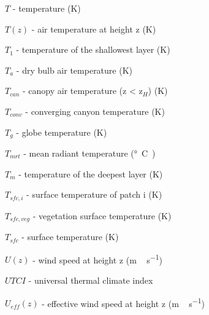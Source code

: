 {\begin{description}
\item $T$  -  temperature (\unit{K}) 
\item $T(z)$  -   air temperature at height z (\unit{K}) 
\item $T_{1}$  -  temperature of the shallowest layer (\unit{K}) 
\item $T_{a}$  -  dry bulb air temperature (\unit{K}) 
\item $T_{can}$  -    canopy air temperature (z < z$_{H}$) (\unit{K}) 
\item $T_{conv}$  -   converging canyon temperature (\unit{K}) 
\item $T_{g}$  -  globe temperature (\unit{K}) 
\item $T_{mrt}$  -  mean radiant temperature (\unit{\degree C)}  
\item $T_{m}$  -    temperature of the deepest layer (\unit{K}) 
\item $T_{sfc,i}$  -  surface temperature of patch i (\unit{K}) 
\item $T_{sfc,veg}$  -   vegetation surface temperature (\unit{K}) 
\item $T_{sfc}$  -  surface temperature (\unit{K}) 
\item $U(z)$  -   wind speed at height z (\unit{m\,s^{-1}})  
\item $UTCI$   -    universal thermal climate index
\item $U_{eff}(z)$  -  effective wind speed at height z (\unit{m\,s^{-1}}) 

\end{description}}
